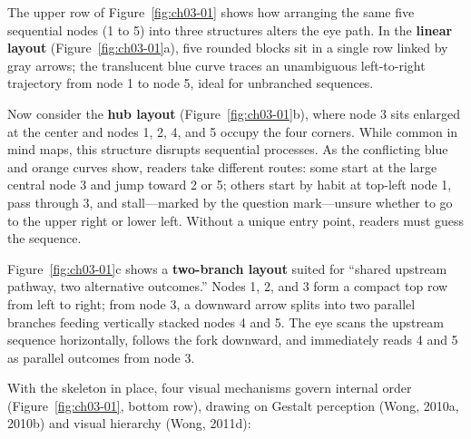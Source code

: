 The upper row of Figure~\ref{fig:ch03-01} shows how arranging the same five sequential nodes (1 to 5) into three structures alters the eye path. In the \textbf{linear layout} (Figure~\ref{fig:ch03-01}a), five rounded blocks sit in a single row linked by gray arrows; the translucent blue curve traces an unambiguous left-to-right trajectory from node 1 to node 5, ideal for unbranched sequences.

Now consider the \textbf{hub layout} (Figure~\ref{fig:ch03-01}b), where node 3 sits enlarged at the center and nodes 1, 2, 4, and 5 occupy the four corners. While common in mind maps, this structure disrupts sequential processes. As the conflicting blue and orange curves show, readers take different routes: some start at the large central node 3 and jump toward 2 or 5; others start by habit at top-left node 1, pass through 3, and stall—marked by the question mark—unsure whether to go to the upper right or lower left. Without a unique entry point, readers must guess the sequence.

Figure~\ref{fig:ch03-01}c shows a \textbf{two-branch layout} suited for ``shared upstream pathway, two alternative outcomes.'' Nodes 1, 2, and 3 form a compact top row from left to right; from node 3, a downward arrow splits into two parallel branches feeding vertically stacked nodes 4 and 5. The eye scans the upstream sequence horizontally, follows the fork downward, and immediately reads 4 and 5 as parallel outcomes from node 3.

With the skeleton in place, four visual mechanisms govern internal order (Figure~\ref{fig:ch03-01}, bottom row), drawing on Gestalt perception (Wong, 2010a, 2010b) and visual hierarchy (Wong, 2011d):


